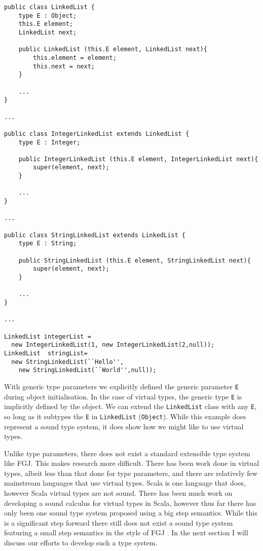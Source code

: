 \documentclass[11pt
              , a4paper
              , twoside
              , openright
              ]{report}
\begin{document}
\begin{lstlisting}[mathescape, style=custom_lang]
public class LinkedList {
	type E : Object;
	this.E element;
	LinkedList next;
	
	public LinkedList (this.E element, LinkedList next){
		this.element = element;
		this.next = next;
	}
	
	...
}

...

public class IntegerLinkedList extends LinkedList {
	type E : Integer;
	
	public IntegerLinkedList (this.E element, IntegerLinkedList next){
		super(element, next);
	}
	
	...
}

...

public class StringLinkedList extends LinkedList {
	type E : String;
	
	public StringLinkedList (this.E element, StringLinkedList next){
		super(element, next);
	}
	
	...
}

...

LinkedList integerList = 
  new IntegerLinkedList(1, new IntegerLinkedList(2,null));
LinkedList  stringList= 
  new StringLinkedList(``Hello'', 
    new StringLinkedList(``World'',null));
\end{lstlisting}
With generic type parameters we explicitly defined the generic parameter \texttt{E} during object initialisation. In the case of virtual types, the generic type \texttt{E} is implicitly defined by the object. We can extend the \texttt{LinkedList} class with any \texttt{E}, so long as it subtypes the \texttt{E} in \texttt{LinkedList} (\texttt{Object}). While this example does represent a sound type system, it does show how we might like to use virtual types.

Unlike type parameters, there does not exist a standard extensible type system like FGJ. This makes research more difficult. There has been work done in virtual types, albeit less than that done for type parameters, and there are relatively few mainstream languages that use virtual types. Scala is one language that does, however Scala virtual types are not sound. There has been much work on developing a sound calculus for virtual types in Scala, however thus far there has only been one sound type system proposed \cite{amin 2014} using a big step semantics. While this is a significant step forward there still does not exist a sound type system featuring a small step semantics in the style of FGJ \cite{fgj}. In the next section I will discuss our efforts to develop such a type system.
\end{document}
